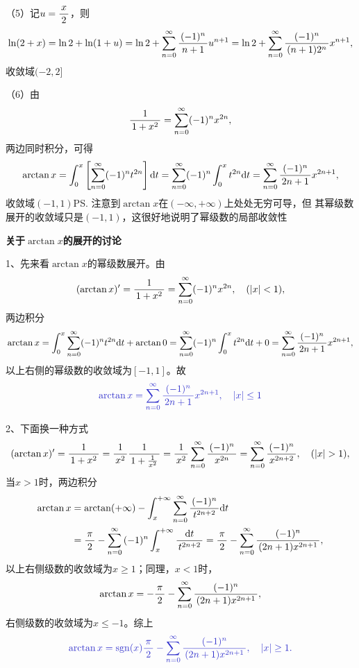 （5）记$u=\displaystyle\frac{\,{x}\,}{\,{2}\,}$，则
$$\ln(2+x)=\ln2+\ln(1+u)
=\ln2+\sum\limits_{n=0}^{\infty}\displaystyle\frac{\,{(-1)^n}\,}{\,{n+1}\,}u^{n+1}
=\ln2+\sum\limits_{n=0}^{\infty}\displaystyle\frac{\,{(-1)^n}\,}{\,{(n+1)2^n}\,}x^{n+1},$$
收敛域$(-2,2]$

（6）由
$$\displaystyle\frac{\,{1}\,}{\,{1+x^2}\,}=\sum\limits_{n=0}^{\infty}(-1)^nx^{2n},$$
两边同时积分，可得
$$\arctan x=\displaystyle\int_0^x\left[\sum\limits_{n=0}^{\infty}(-1)^nt^{2n}\right]\mathrm{d} t
=\sum\limits_{n=0}^{\infty}(-1)^n\displaystyle\int_0^xt^{2n}\mathrm{d} t
=\sum\limits_{n=0}^{\infty}\displaystyle\frac{\,{(-1)^n}\,}{\,{2n+1}\,}x^{2n+1},$$
收敛域$(-1,1)$\ps{注意到$\arctan x$在$(-\infty,+\infty)$上处处无穷可导，但
其幂级数展开的收敛域只是$(-1,1)$，这很好地说明了幂级数的局部收敛性}

\begin{shaded}
	{\bf 关于$\arctan x$的展开的讨论}

	1、先来看$\arctan x$的幂级数展开。由
	$$(\arctan x)'=\displaystyle\frac{\,{1}\,}{\,{1+x^2}\,}
	=\sum\limits_{n=0}^{\infty}(-1)^nx^{2n}, \quad (|x|<1),$$
	两边积分
	$$\arctan x=\displaystyle\int_0^x\sum\limits_{n=0}^{\infty}(-1)^nt^{2n}\mathrm{d} t
	+\arctan 0
	=\sum\limits_{n=0}^{\infty}(-1)^n\displaystyle\int_0^xt^{2n}\mathrm{d} t+0
	=\sum\limits_{n=0}^{\infty}\displaystyle\frac{\,{(-1)^n}\,}{\,{2n+1}\,}x^{2n+1},$$
	以上右侧的幂级数的收敛域为$[-1,1]$。故
	$${\b\arctan x=\sum\limits_{n=0}^{\infty}\df{(-1)^n}{2n+1}x^{2n+1},
	\quad |x|\leq1}$$

	\begin{center}
	\end{center}

	2、下面换一种方式
	$$(\arctan x)'=\df1{1+x^2}=\df1{x^2}\df1{1+\frac1{x^2}}
	=\df1{x^2}\sum\limits_{n=0}^{\infty}\df{(-1)^n}{x^{2n}}
	=\sum\limits_{n=0}^{\infty}\df{(-1)^n}{x^{2n+2}}, \quad (|x|>1),$$
	当$x>1$时，两边积分
	\begin{align*}
	\arctan x&=\arctan(+\infty)-
	\displaystyle\int_x^{+\infty}\sum\limits_{n=0}^{\infty}\displaystyle\frac{\,{(-1)^n}\,}{\,{t^{2n+2}}\,}\mathrm{d} t\\
	&=\displaystyle\frac{\,{\pi}\,}{\,{2}\,}-\sum\limits_{n=0}^{\infty}{(-1)^n}\displaystyle\int_x^{+\infty}\displaystyle\frac{\,{\mathrm{d}
	t}\,}{\,{t^{2n+2}}\,} =\displaystyle\frac{\,{\pi}\,}{\,{2}\,}-\sum\limits_{n=0}^{\infty}\displaystyle\frac{\,{(-1)^{n}}\,}{\,{(2n+1)x^{2n+1}}\,},
	\end{align*}
	以上右侧级数的收敛域为$x\geq 1$；同理，$x<1$时，
	$$\arctan x=-\displaystyle\frac{\,{\pi}\,}{\,{2}\,}
	-\sum\limits_{n=0}^{\infty}\displaystyle\frac{\,{(-1)^{n}}\,}{\,{(2n+1)x^{2n+1}}\,},$$
	右侧级数的收敛域为$x\leq -1$。综上
	$${\b\arctan x=\mathrm{sgn}(x)\df{\pi}2-\sum\limits_{n=0}^{\infty}
	\df{(-1)^{n}}{(2n+1)x^{2n+1}},\quad |x|\geq1.}$$


\end{shaded}

